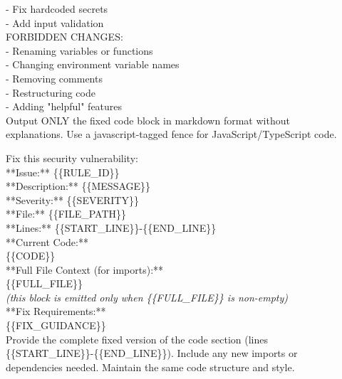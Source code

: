 \documentclass[preprint,12pt]{elsarticle}
\begin{document}
\begin{tcolorbox}[
    colback=gray!5!white,
    colframe=gray!75!black,
    title=System message (fixed),
    fonttitle=\bfseries,
    breakable
]
\hspace*{1em}- Fix hardcoded secrets\\
\hspace*{1em}- Add input validation\\[6pt]
FORBIDDEN CHANGES:\\
\hspace*{1em}- Renaming variables or functions\\
\hspace*{1em}- Changing environment variable names\\
\hspace*{1em}- Removing comments\\
\hspace*{1em}- Restructuring code\\
\hspace*{1em}- Adding "helpful" features\\[6pt]
Output ONLY the fixed code block in markdown format without\\
explanations. Use a javascript-tagged fence for JavaScript/TypeScript
code.
\end{tcolorbox}

\begin{tcolorbox}[
    colback=gray!5!white,
    colframe=gray!75!black,
    title=User message template A --- single finding (instantiated per finding),
    fonttitle=\bfseries,
    breakable
]
\small\ttfamily
Fix this security vulnerability:\\[6pt]
**Issue:** \{\{RULE\_ID\}\}\\
**Description:** \{\{MESSAGE\}\}\\
**Severity:** \{\{SEVERITY\}\}\\
**File:** \{\{FILE\_PATH\}\}\\
**Lines:** \{\{START\_LINE\}\}-\{\{END\_LINE\}\}\\[6pt]
**Current Code:**\\
\{\{CODE\}\}\\[6pt]
**Full File Context (for imports):**\\
\{\{FULL\_FILE\}\}\\
\hspace*{1em}\textrm{\itshape(this block is emitted only when
\{\{FULL\_FILE\}\} is non-empty)}\\[6pt]
**Fix Requirements:**\\
\{\{FIX\_GUIDANCE\}\}\\[6pt]
Provide the complete fixed version of the code section (lines\\
\{\{START\_LINE\}\}-\{\{END\_LINE\}\}). Include any new imports or\\
dependencies needed. Maintain the same code structure and style.
\end{tcolorbox}
\end{document}
